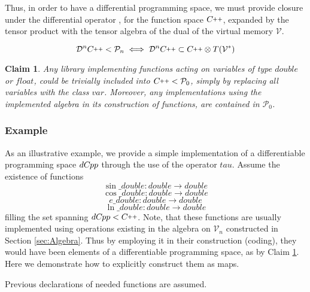 \documentclass{article}
\newcommand{\VV}{\mathcal{V}}
\newcommand{\CC}{C\nolinebreak\hspace{-.05em}\raisebox{.4ex}{\tiny\bf +}\nolinebreak\hspace{-.10em}\raisebox{.4ex}{\tiny\bf +}}
\def\CC{{C\nolinebreak[4]\hspace{-.05em}\raisebox{.4ex}{\tiny\bf ++}}}
\newcommand{\dP}{\mathcal{P}}
\newcommand{\DD}{\mathcal{D}}
\newcommand{\dCpp}{dC\nolinebreak\hspace{-.05em}\raisebox{.4ex}{\tiny\bf +}\nolinebreak\hspace{-.10em}\raisebox{.4ex}{\tiny\bf p}}
\def\dCpp{{dC\nolinebreak[4]\hspace{-.05em}pp}}
\newtheorem{trditev}{Claim}[section]
\begin{document}
              Thus, in order to have a differential programming space, we must provide closure under the differential operator \cite[Corollary~10]{OperationalCalculus}, for the function space $\CC$, expanded by the tensor product with the tensor algebra of the dual of the virtual memory $\VV$.
              
              \begin{equation}
              \DD^n\CC<\dP_n\iff\DD^n\CC\subset\CC\otimes T(\VV^*)
              \end{equation}

\begin{trditev}\label{trd:library}
Any library implementing functions acting on variables of type $double$ or $float$, could be trivially included into $\CC<\dP_0$, simply by replacing all variables with the class $var$. Moreover, any implementations using the implemented algebra in its construction of functions, are contained in $\dP_0$.
\end{trditev}

\subsubsection{Example}\label{sec:example}
  
As an illustrative example, we provide a simple implementation of a differentiable programming space $\dCpp$ through the use of the operator $tau$. 
Assume the existence of functions
\begin{equation}
\sin\_double:double\to double
\end{equation}
\begin{equation}
\cos\_double:double\to double
\end{equation} 
\begin{equation}
e\_double:double\to double
\end{equation}  
\begin{equation}
\ln\_double:double\to double
\end{equation} 
filling the set spanning $\dCpp<\CC$. Note, that these functions are usually implemented using operations existing in the algebra on $\VV_n$ constructed in Section \ref{sec:Algebra}. Thus by employing it in their construction (coding), they would have been elements of a differentiable programming space, as by Claim \ref{trd:library}. Here we demonstrate how to explicitly construct them as maps.

Previous declarations of needed functions are assumed. 
\end{document}
